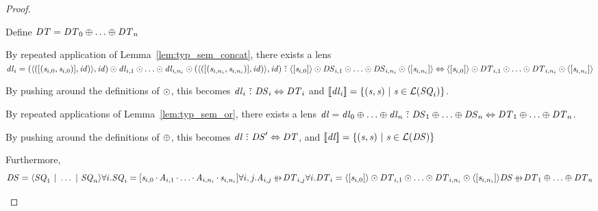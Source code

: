 \documentclass[acmsmall]{acmart}
\begin{document}
\begin{proof}
\begin{case}[\ParallelSwapDNFStructuralRewriteRule{}]
    Define $\mathit{DT} = \mathit{DT}_0 \oplus \ldots \oplus \mathit{DT}_n$
    
    By repeated application of Lemma~\ref{lem:typ_sem_concat}, there exists a
    lens
    $\mathit{dl}_i =
    (\langle([(\mathit{s}_{i,0},\mathit{s}_{i,0})],\mathit{id})\rangle,\mathit{id})
    \odot \mathit{dl}_{i,1}
    \odot \ldots \odot
    \mathit{dl}_{i,n_i} \odot
    (\langle([(\mathit{s}_{i,n_i},\mathit{s}_{i,n_i})],\mathit{id})\rangle,\mathit{id})
    \,\,\tilde{:}\,\,
    \langle[\mathit{s}_{i,0}]\rangle \odot
    \mathit{DS}_{i,1} \odot \ldots \odot \mathit{DS}_{i,n_i}
    \odot \langle[\mathit{s}_{i,n_i}]\rangle \Leftrightarrow
    \langle[\mathit{s}_{i,0}]\rangle \odot
    \mathit{DT}_{i,1} \odot \ldots \odot \mathit{DT}_{i,n_i}
    \odot \langle[\mathit{s}_{i,n_i}]\rangle$
    
    By pushing around the definitions of $\odot$, this becomes
    $\mathit{dl}_i \,\,\tilde{:}\,\,
    \mathit{DS}_i
    \Leftrightarrow
    \mathit{DT}_i$ and
    $[ \! [\mathit{dl}_i] \! ] = \{(\mathit{s},\mathit{s}) ~|~
      \mathit{s} \in \mathcal{L}(\mathit{SQ}_i)\}$.

    By repeated applications of Lemma~\ref{lem:typ_sem_or}, there exists a lens
    $\mathit{dl} =
    \mathit{dl}_0 \oplus \ldots \oplus \mathit{dl}_n 
    \,\,\tilde{:}\,\,
    \mathit{DS}_1 \oplus \ldots \oplus \mathit{DS}_n
    \Leftrightarrow
    \mathit{DT}_1 \oplus \ldots \oplus \mathit{DT}_n$.
    
    By pushing around the definitions of $\oplus$, this becomes
    $\mathit{dl} \,\,\tilde{:}\,\,
    \mathit{DS}' \Leftrightarrow \mathit{DT}$, and
    $[ \! [\mathit{dl}] \! ] =
    \{(\mathit{s},\mathit{s}) ~|~ \mathit{s}\in\mathcal{L}(\mathit{DS})\}$

    Furthermore,
    \[
      {
        \DNFRegex = \DNFOf{\Sequence_1 \DNFSep \ldots \DNFSep \Sequence_n}\\
        \forall i. \Sequence_i =
        \SequenceOf{\String_{i,0} \SeqSep \Atom_{i,1} \SeqSep \ldots \SeqSep \Atom_{i,n_i} \SeqSep \String_{i,n_i}}\\
        \forall i,j. \Atom_{i,j} \ParallelRewrite \DNFRegexAlt_{i,j}\\
        \forall i. \DNFRegexAlt_i = \DNFOf{\SequenceOf{\String_{i,0}}}
        \ConcatDNF \DNFRegexAlt_{i,1}
        \ConcatDNF \ldots \ConcatDNF \DNFRegexAlt_{i,n_i} \ConcatDNF
        \DNFOf{\SequenceOf{\String_{i,n_i}}}
      }
      {
        \DNFRegex \ParallelRewrite \DNFRegexAlt_1 \OrDNF \ldots \OrDNF \DNFRegexAlt_n
      }
    \]
  \end{case}
  

\end{proof}
\end{document}
